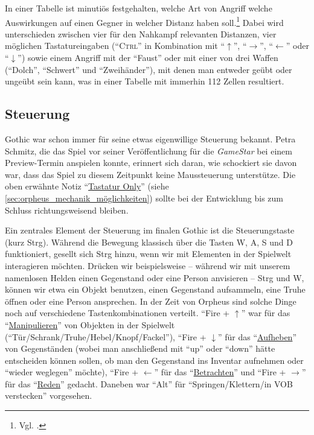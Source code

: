 \documentclass[a5paper,pagesize]{scrbook}
\begin{document}
In einer Tabelle ist minutiös festgehalten, welche Art von Angriff welche Auswirkungen auf einen Gegner in welcher Distanz haben soll.\footnote{Vgl. \autocite[S.~4--5]{orpheus_kampfsteuerung}.}
Dabei wird unterschieden zwischen vier für den Nahkampf relevanten Distanzen, vier möglichen Tastatureingaben (\enquote{\textsc{Ctrl}} in Kombination mit \enquote{$\uparrow$}, \enquote{$\rightarrow$}, \enquote{$\leftarrow$} oder \enquote{$\downarrow$}) sowie einem Angriff mit der \enquote{Faust} oder mit einer von drei Waffen (\enquote{Dolch}, \enquote{Schwert} und \enquote{Zweihänder}), mit denen man entweder geübt oder ungeübt sein kann, was in einer Tabelle mit immerhin 112 Zellen resultiert.\autocite[S.~4]{orpheus_kampfsteuerung}


\subsection{Steuerung}\label{sec:orpheus_mechanik_steuerung}
Gothic war schon immer für seine etwas eigenwillige Steuerung bekannt.
Petra Schmitz, die das Spiel vor seiner Veröffentlichung für die \textit{GameStar} bei einem Preview-Termin anspielen konnte, erinnert sich daran, wie schockiert sie davon war, dass das Spiel zu diesem Zeitpunkt keine Maussteuerung unterstütze.\autocite{schmitz_maussteuerung_2021}
Die oben erwähnte Notiz \enquote{\uline{Tastatur Only}}\autocite[S.~1]{orpheus_interface} (siehe \autoref{sec:orpheus_mechanik_möglichkeiten}) sollte bei der Entwicklung bis zum Schluss richtungsweisend bleiben.

Ein zentrales Element der Steuerung im finalen Gothic ist die Steuerungstaste (kurz Strg).
Während die Bewegung klassisch über die Tasten W, A, S und D funktioniert, gesellt sich Strg hinzu, wenn wir mit Elementen in der Spielwelt interagieren möchten.
Drücken wir beispielsweise -- während wir mit unserem namenlosen Helden einen Gegenstand oder eine Person anvisieren -- Strg und W, können wir etwa ein Objekt benutzen, einen Gegenstand aufsammeln, eine Truhe öffnen oder eine Person ansprechen.
In der Zeit von Orpheus sind solche Dinge noch auf verschiedene Tastenkombinationen verteilt.
\enquote{Fire + $\uparrow$} war für das \enquote{\uline{Manipulieren}} von Objekten in der Spielwelt (\enquote{Tür/Schrank/Truhe/Hebel/Knopf/Fackel}), \enquote{Fire + $\downarrow$} für das \enquote{\uline{Aufheben}} von Gegenständen (wobei man anschließend mit \enquote{up} oder \enquote{down} hätte entscheiden können sollen, ob man den Gegenstand ins Inventar aufnehmen oder \enquote{wieder weglegen} möchte), \enquote{Fire + $\leftarrow$} für das \enquote{\uline{Betrachten}} und \enquote{Fire + $\rightarrow$} für das \enquote{\uline{Reden}} gedacht.\autocite[S.~2]{orpheus_interface}
Daneben war \enquote{Alt} für \enquote{Springen/Klettern/in VOB verstecken} vorgesehen.\autocite[S.~3]{orpheus_interface}
\end{document}
